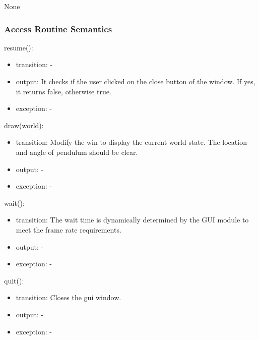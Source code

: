\documentclass[12pt, titlepage]{article}
\begin{document}
None

\subsubsection{Access Routine Semantics}

\noindent resume():
\begin{itemize}
\item transition: -
\item output: It checks if the user clicked on the close button of the window. 
      If yes, it returns false, otherwise true.
\item exception: -
\end{itemize}

\noindent draw(world):
\begin{itemize}
\item transition: Modify the win to display the current world state. The location 
      and angle of pendulum should be clear.
\item output: -
\item exception: -
\end{itemize}

\noindent wait():
\begin{itemize}
\item transition: The wait time is dynamically determined by the GUI module to meet 
                  the frame rate requirements.
\item output: -
\item exception: -
\end{itemize}

\noindent quit():
\begin{itemize}
\item transition: Closes the gui window.
\item output: -
\item exception: -
\end{itemize}



\end{document}
